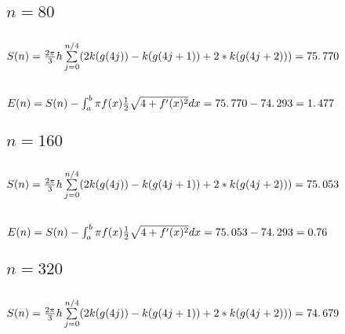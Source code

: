 \documentclass{article}
\begin{document}
\bigskip

\subsection{$n=80$}

\subsection{$S(n)=\frac{2\protect\pi }{3}h\sum%
\limits_{j=0}^{n/4}(2k(g(4j))-k(g(4j+1))+2\ast k(g(4j+2)))=\allowbreak
75.\,\allowbreak 770$}

\subsection{$E(n)=S(n)-\protect\int_{a}^{b}\protect\pi f(x)\frac{1}{2}%
\protect\sqrt{4+f^{\prime }(x)^{2}}dx=\allowbreak 75.\,\allowbreak
770-\allowbreak \allowbreak 74.\,\allowbreak 293=\allowbreak 1.\,\allowbreak
477$}

\bigskip

\subsection{$n=160$}

\subsection{$S(n)=\frac{2\protect\pi }{3}h\sum%
\limits_{j=0}^{n/4}(2k(g(4j))-k(g(4j+1))+2\ast k(g(4j+2)))=75.\,\allowbreak
053\allowbreak $}

\subsection{$E(n)=S(n)-\protect\int_{a}^{b}\protect\pi f(x)\frac{1}{2}%
\protect\sqrt{4+f^{\prime }(x)^{2}}dx=\allowbreak 75.\,\allowbreak
053\allowbreak -\allowbreak \allowbreak 74.\,\allowbreak 293=\allowbreak
0.76 $}

\bigskip

\subsection{$n=320$}

\subsection{$S(n)=\frac{2\protect\pi }{3}h\sum%
\limits_{j=0}^{n/4}(2k(g(4j))-k(g(4j+1))+2\ast k(g(4j+2)))=\allowbreak
74.\,\allowbreak 679$}
\end{document}
